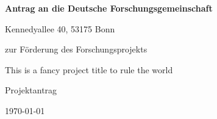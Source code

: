 {

  \vspace*{20ex}

  \begin{center}
  \large

  {\bfseries Antrag an die Deutsche Forschungsgemeinschaft}

  Kennedyallee 40, 53175 Bonn

  \vspace{4ex}

  zur Förderung des Forschungsprojekts

  \vspace{9ex}

  \begin{bfseries}
    This is a fancy project title to rule the world
  \end{bfseries}

  \medskip

	 Projektantrag

  \vspace{9ex}

	\vspace{9ex}

	\today
  \end{center}
}

